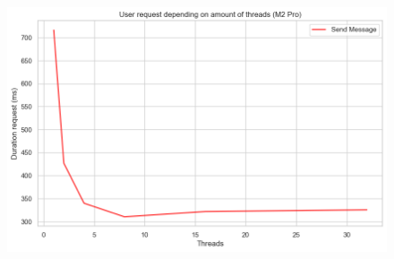\documentclass[a4paper]{article}
\begin{document}
\begin{figure}[H]
	\centering
	\includegraphics[width = \linewidth]{Images/ThroughputMessage.png}
	\caption{}
\end{figure}
\end{document}
